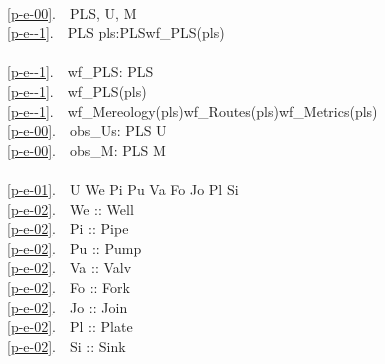 \mnewfoil\LLLL
{}
\bp
{}\\
\ref{p-e-00}.\ \ PLS{\PRIM}, U, M \\
\ref{p-e--1}.\ \ PLS {\EQ} {\LBRACE}{\BAR} pls:PLS{\PRIM}{\RDOT}wf\_PLS(pls) {\BAR}{\RBRACE}  \\
\\
\ref{p-e--1}.\ \ wf\_PLS: PLS {\RIGHTARROW}  \\
\ref{p-e--1}.\ \ wf\_PLS(pls) {\IS}\\
\ref{p-e--1}.\ \ wf\_Mereology(pls){\WEDGE}wf\_Routes(pls){\WEDGE}wf\_Metrics(pls)\footnotemark\\
\ref{p-e-00}.\ \ obs\_Us: PLS {\RIGHTARROW} U \\
\ref{p-e-00}.\ \ obs\_M: PLS {\RIGHTARROW} M \\
\\
\ref{p-e-01}.\ \ U {\EQ} We {\BAR} Pi {\BAR} Pu {\BAR} Va {\BAR} Fo {\BAR} Jo {\BAR} Pl {\BAR} Si\\
\ref{p-e-02}.\ \ We :: Well\\
\ref{p-e-02}.\ \ Pi :: Pipe \\
\ref{p-e-02}.\ \ Pu :: Pump \\
\ref{p-e-02}.\ \ Va :: Valv\\
\ref{p-e-02}.\ \ Fo :: Fork\\
\ref{p-e-02}.\ \ Jo :: Join\\
\ref{p-e-02}.\ \ Pl :: Plate\\
\ref{p-e-02}.\ \ Si :: Sink
\ep
\tehrantutorial{\end{multicols}}{}


